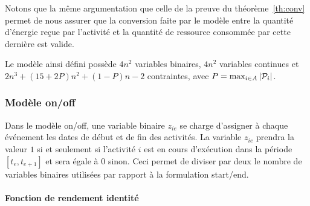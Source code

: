 Notons que la même argumentation que celle de la preuve du
théorème~\ref{th:conv} permet de nous assurer que la conversion faite
par le modèle entre la quantité d'énergie reçue par l'activité et la
quantité de ressource consommée par cette dernière est valide.

Le modèle ainsi défini possède $4n^2$ variables binaires, $4n^2$
variables continues et $2n^3+ (15 + 2P)n^2+\left(1-P\right)n-2$
contraintes, avec $P=\max_{i\in A}|\P_i|$.

\subsubsection{Modèle on/off}
\label{sssection:OO_CECSP}
Dans le modèle on/off, une variable binaire $z_{ie}$ se charge
d'assigner à chaque événement les dates de début et de fin des
activités. La variable $z_{ie}$ prendra la valeur $1$ si et seulement
si l'activité $i$ est en cours d'exécution dans la période
$[t_e,t_{e+1}]$ et sera égale à $0$ sinon. Ceci permet de diviser par
deux le nombre de variables binaires utilisées par rapport à la
formulation start/end.

\paragraph{Fonction de rendement identité}

